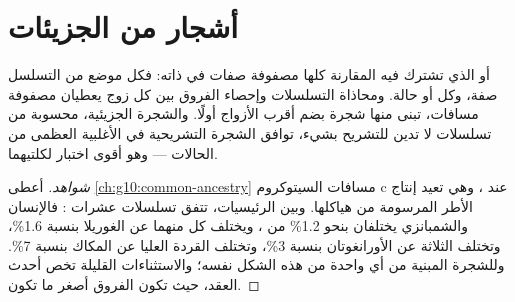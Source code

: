 \section{أشجار من الجزيئات}

\begin{proposition}\label{prop:g12:phylogenetic-trees:molecular}
 أو  الذي تشترك فيه  المقارنة كلها مصفوفة صفات
في ذاته: فكل موضع من التسلسل صفة، وكل  أو  حالة.
ومحاذاة التسلسلات وإحصاء الفروق بين كل زوج يعطيان مصفوفة مسافات، تبنى
منها شجرة بضم أقرب الأزواج أولًا. والشجرة الجزيئية، محسوبة من تسلسلات
لا تدين للتشريح بشيء، توافق الشجرة التشريحية في الأغلبية العظمى من
الحالات --- وهو أقوى اختبار لكلتيهما.
\end{proposition}
\begin{proof}[شواهد]
أعطى \cref{ch:g10:common-ancestry} مسافات السيتوكروم c عند ،
وهي تعيد إنتاج الأطر المرسومة من هياكلها. وبين الرئيسيات، تتفق تسلسلات
عشرات : فالإنسان والشمبانزي يختلفان بنحو 1.2\% من ،
ويختلف كل منهما عن الغوريلا بنسبة 1.6\%، وتختلف الثلاثة عن
الأورانغوتان بنسبة 3\%، وتختلف القردة العليا عن المكاك بنسبة 7\%.
وللشجرة المبنية من أي واحدة من هذه  الشكل نفسه؛ والاستثناءات
القليلة تخص أحدث العقد، حيث تكون الفروق أصغر ما تكون.
\end{proof}

